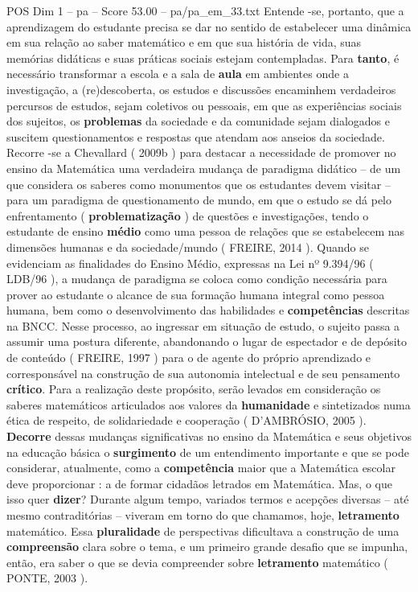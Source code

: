 \begin{textsample}{POS Dim 1 – pa – Score 53.00 – pa/pa\_em\_33.txt}
Entende -se, portanto, que a aprendizagem do estudante precisa se dar no sentido de estabelecer uma dinâmica em sua relação ao saber matemático e em que sua história de vida, suas memórias didáticas e suas práticas sociais estejam contempladas.
Para \textbf{tanto}, é necessário transformar a escola e a sala de \textbf{aula} em ambientes onde a investigação, a (re)descoberta, os estudos e discussões encaminhem verdadeiros percursos de estudos, sejam coletivos ou pessoais, em que as experiências sociais dos sujeitos, os \textbf{problemas} da sociedade e da comunidade sejam dialogados e suscitem questionamentos e respostas que atendam aos anseios da sociedade.
Recorre -se a Chevallard ( 2009b ) para destacar a necessidade de promover no ensino da Matemática uma verdadeira mudança de paradigma didático – de um que considera os saberes como monumentos que os estudantes devem visitar – para um paradigma de questionamento de mundo, em que o estudo se dá pelo enfrentamento ( \textbf{problematização} ) de questões e investigações, tendo o estudante de ensino \textbf{médio} como uma pessoa de relações que se estabelecem nas dimensões humanas e da sociedade/mundo ( FREIRE, 2014 ).
Quando se evidenciam as finalidades do Ensino Médio, expressas na Lei nº 9.394/96 ( LDB/96 ), a mudança de paradigma se coloca como condição necessária para prover ao estudante o alcance de sua formação humana integral como pessoa humana, bem como o desenvolvimento das habilidades e \textbf{competências} descritas na BNCC.
Nesse processo, ao ingressar em situação de estudo, o sujeito passa a assumir uma postura diferente, abandonando o lugar de espectador e de depósito de conteúdo ( FREIRE, 1997 ) para o de agente do próprio aprendizado e corresponsável na construção de sua autonomia intelectual e de seu pensamento \textbf{crítico}.
Para a realização deste propósito, serão levados em consideração os saberes matemáticos articulados aos valores da \textbf{humanidade} e sintetizados numa ética de respeito, de solidariedade e cooperação ( D’AMBRÓSIO, 2005 ). \textbf{Decorre} dessas mudanças significativas no ensino da Matemática e seus objetivos na educação básica o \textbf{surgimento} de um entendimento importante e que se pode considerar, atualmente, como a \textbf{competência} maior que a Matemática escolar deve proporcionar : a de formar cidadãos letrados em Matemática.
Mas, o que isso quer \textbf{dizer}?
Durante algum tempo, variados termos e acepções diversas – até mesmo contraditórias – viveram em torno do que chamamos, hoje, \textbf{letramento} matemático.
Essa \textbf{pluralidade} de perspectivas dificultava a construção de uma \textbf{compreensão} clara sobre o tema, e um primeiro grande desafio que se impunha, então, era saber o que se devia compreender sobre \textbf{letramento} matemático ( PONTE, 2003 ).

\end{textsample}
